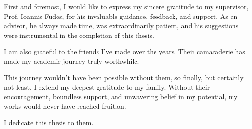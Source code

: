 First and foremost, I would like to express my sincere gratitude to my supervisor, Prof. Ioannis Fudos, for his invaluable  guidance, feedback, and support. As an advisor, he always made time, was extraordinarily patient, and his suggestions were instrumental in the completion of this thesis.

I am also grateful to the friends I've made over the years. Their camaraderie has made my academic journey truly worthwhile.

This journey wouldn't have been possible without them, so finally, but certainly not least, I extend my deepest gratitude to my family. Without their encouragement, boundless support, and unwavering belief in my potential, my works would never have reached fruition. \newline

I dedicate this thesis to them.